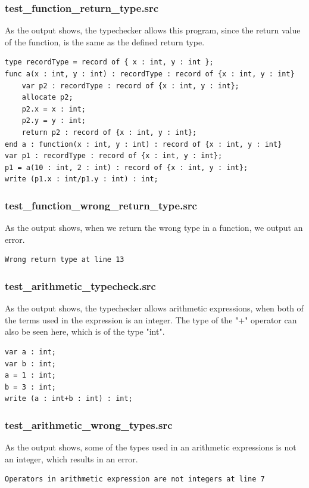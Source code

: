 \documentclass[a4paper,10pt,titlepage]{report}
\begin{document}
\subsubsection{test\_function\_return\_type.src}
As the output shows, the typechecker allows this program, since the return value of the function, is the same as the defined return type.
\begin{lstlisting}
type recordType = record of { x : int, y : int };
func a(x : int, y : int) : recordType : record of {x : int, y : int}
    var p2 : recordType : record of {x : int, y : int};
    allocate p2;
    p2.x = x : int;
    p2.y = y : int;
    return p2 : record of {x : int, y : int};
end a : function(x : int, y : int) : record of {x : int, y : int}
var p1 : recordType : record of {x : int, y : int};
p1 = a(10 : int, 2 : int) : record of {x : int, y : int};
write (p1.x : int/p1.y : int) : int;
\end{lstlisting}

\subsubsection{test\_function\_wrong\_return\_type.src}
As the output shows, when we return the wrong type in a function, we output an error.
\begin{lstlisting}
Wrong return type at line 13
\end{lstlisting}

\subsubsection{test\_arithmetic\_typecheck.src}
As the output shows, the typechecker allows arithmetic expressions, when both of the terms used in the expression is an integer. The type of the "+" operator can also be seen here, which is of the type "int".
\begin{lstlisting}
var a : int;
var b : int;
a = 1 : int;
b = 3 : int;
write (a : int+b : int) : int;
\end{lstlisting}

\subsubsection{test\_arithmetic\_wrong\_types.src}
As the output shows, some of the types used in an arithmetic expressions is not an integer, which results in an error.
\begin{lstlisting}
Operators in arithmetic expression are not integers at line 7
\end{lstlisting}
\end{document}
